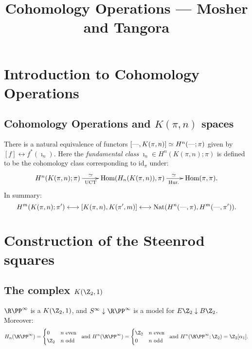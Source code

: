 \documentclass[11pt]{article}
\title{Cohomology Operations\small{ --- Mosher and Tangora}}
\author{}
\date{}
\newcommand{\Hom}{\textup{Hom}}
\newcommand{\DASH}{\textup{---}}
\theoremstyle{plain}
\theoremstyle{definition}
\newcommand{\RP}{{\R\PP}}
\begin{document}
\tableofcontents

\section{Introduction to Cohomology Operations}
\subsection{Cohomology Operations and \texorpdfstring{$K(\pi,n)$}{K(G,n)} spaces}
There is a natural equivalence of functors $[\DASH,K(\pi,n)]\simeq H^n(\DASH;\pi)$ given by $[f]\longleftrightarrow f^*(\imath_n)$. Here the \emph{fundamental class} $\imath_n\in H^n(K(\pi,n);\pi)$ is defined to be the cohomology class corresponding to $\text{id}_\pi$ under:
\[\xymatrix{
H^n(K(\pi,n);\pi)\ar[r]^{\simeq\ \ \ \ }_{\textup{UCT}\ \ \ \ }&\Hom(H_n(K(\pi,n)),\pi)\ar[r]_{\ \ \ \ \ \ \text{Hur.}}^{\ \ \ \ \ \ \simeq}&\Hom(\pi,\pi).
}\]
In summary:
\[H^m(K(\pi,n);\pi')\longleftrightarrow [K(\pi,n),K(\pi',m)]\longleftrightarrow \textup{Nat}( H^n(\DASH,\pi), H^{m}(\DASH,\pi')).\]



\section{Construction of the Steenrod squares}
\subsection{The complex \texorpdfstring{$K(\Z_2,1)$}{K(Z/2,1)}}
$\RP^\infty$ is a $K(\Z_2,1)$, and $S^\infty\downarrow\RP^\infty$ is a model for $E\Z_2\downarrow B\Z_2$. Moreover:
\[H_n(\RP^\infty)=\begin{cases}0&n\text{ even}\\\Z_2&n\text{ odd}\end{cases}\ \text{ and }H^n(\RP^\infty)=\begin{cases}\Z_2&n\text{ even}\\0&n\text{ odd}\end{cases}\ \text{ and }H^n(\RP^\infty;\Z_2)=\Z_2[\alpha_1].\]
\end{document}
